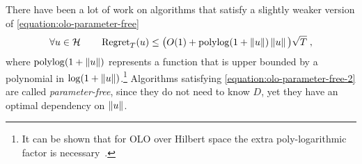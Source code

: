 There have been a lot of work on algorithms
\citep{Streeter-McMahan-2012, Orabona-2013, McMahan-Abernethy-2013,
McMahan-Orabona-2014,Orabona-Pal-2016-parameter-free} that satisfy a slightly weaker version of
\eqref{equation:olo-parameter-free}
\begin{equation}
\label{equation:olo-parameter-free-2}
\forall u \in \mathcal{H} \qquad \operatorname{Regret}_T(u) \le \big(O(1)+\operatorname{polylog}(1 + \left\|{u}\right\|)\left\|{u}\right\| \big) \sqrt{T} \; ,
\end{equation}
where $\operatorname{polylog}(1 + \left\|{u}\right\|)$ represents a function that is upper bounded
by a polynomial in $\log(1+\left\|{u}\right\|)$.\footnote{It can be shown
that for \ac{OLO} over Hilbert space the extra poly-logarithmic factor is
necessary~\citep{McMahan-Abernethy-2013,Orabona-2013}.} Algorithms satisfying
\eqref{equation:olo-parameter-free-2} are called \emph{parameter-free}, since
they do not need to know $D$, yet they have an optimal dependency on $\left\|{u}\right\|$.

